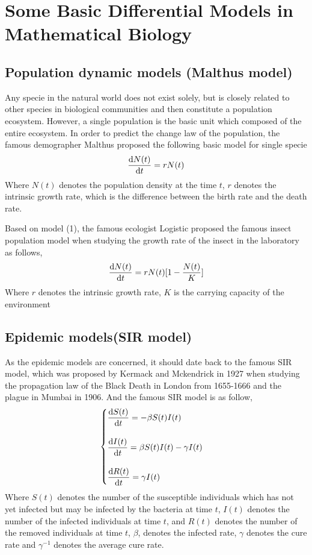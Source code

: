 \documentclass[]{article}
\begin{document}
\section{Some Basic Differential Models in Mathematical Biology}
\subsection{Population dynamic models (Malthus model)}
Any specie in the natural world does not exist solely, 
but is closely related to other species in biological 
communities and then constitute a population ecosystem. 
However,        a single population is the basic unit which 
composed of the entire ecosystem. In order to predict 
the change law of the population, the famous demographer 
Malthus proposed the following basic model for single 
specie
\begin{equation}
        \dv{N(t)}{t} =rN(t)
\end{equation}
Where $N(t)$ denotes the population density at the time $t$, $r$ denotes the intrinsic growth rate, which is the difference between the birth rate and the death rate.

Based on model (1), the famous ecologist Logistic proposed the famous insect population model when studying the growth rate of the insect in the laboratory as follows,
\[
        \dv{N(t)}{t} =rN(t)[1-\frac{N(t)}{K}]
\]
Where $r$ denotes the intrinsic growth rate, $K$ is the carrying capacity of the environment


\subsection{Epidemic models(SIR model)}
As the epidemic models are concerned, it should date back to the famous SIR model, 
which was proposed by Kermack and Mckendrick in 1927 when studying the propagation 
law of the Black Death in London from 1655-1666 and the plague in Mumbai in 1906. 
And the famous SIR model is as follow,
\begin{equation}
        \begin{cases}
                \displaystyle \dv{S(t)}{t} = -\beta S(t)I(t)
                \\\\
                \displaystyle \dv{I(t)}{t} = \beta S(t)I(t)-\gamma I(t)
                \\\\
                \displaystyle \dv{R(t)}{t} = \gamma I(t)
        \end{cases}               
\end{equation}
Where $S(t)$ denotes the number of the susceptible individuals which has not yet infected 
but may be infected by the bacteria at time $t$, $I(t)$ denotes the number of the infected 
individuals at time $t$, and $R(t)$ denotes the number of the removed individuals at time $t$, $\beta$, 
denotes the infected rate, $\gamma$ denotes the cure rate and $\gamma^{-1}$ denotes the average cure rate.
\end{document}
